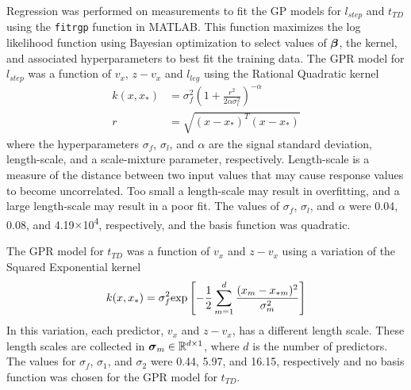 Regression was performed on measurements to fit the GP models for $ l_{step} $ and $ t_{TD} $ using the \texttt{fitrgp} function in  MATLAB. This function maximizes the log likelihood function using Bayesian optimization to select values of $ \boldsymbol{\beta} $, the kernel, and associated hyperparameters to best fit the training data. The GPR model for $ l_{step} $ was a function of $ v_x $, $ z-v_x $ and $ l_{leg} $ using the Rational Quadratic kernel 
\begin{align*}
	k(x,x_*) &= \sigma_f^2 \left( 1 + \frac{r^2}{2 \alpha \sigma_l^2}\right)^{-\alpha}\\
	r &= \sqrt{(x-x_*)^T(x-x_*)}
\end{align*}
where the hyperparameters $ \sigma_f $, $ \sigma_l $, and $ \alpha $ are the signal standard deviation, length-scale, and a scale-mixture parameter, respectively. Length-scale is a measure of the distance between two input values that may cause response values to become uncorrelated. Too small a length-scale may result in overfitting, and a large length-scale may result in a poor fit. The values of $ \sigma_f $, $ \sigma_l $, and $ \alpha $ were 0.04, 0.08, and 4.19$ \times $10\textsuperscript{4}, respectively, and the basis function was quadratic.

The GPR model for $ t_{TD} $ was a function of $ v_x $ and $ z-v_x $ using a variation of the Squared Exponential kernel  
\[
	k(x,x_*) = \sigma_f^2 {\rm exp}\left[-\frac{1}{2} \displaystyle \sum_{m = 1}^{d} \frac{(x_m - x_{*m})^2}{\sigma_m^2} \right]
\]
In this variation, each predictor, $ v_x $ and $ z-v_x $, has a different length scale. These length scales are collected in $ \boldsymbol{\sigma}_m \in \mathbb{R}^{d \times 1}$, where $ d $ is the number of predictors. The values for $ \sigma_f $, $ \sigma_1 $, and $ \sigma_2 $ were 0.44, 5.97, and 16.15, respectively and no basis function was chosen for the GPR model for $ t_{TD} $.  
%
%

